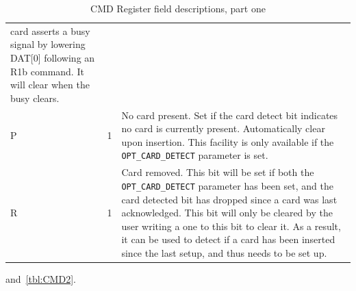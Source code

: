 \documentclass{gqtekspec}
\begin{document}
\begin{table}
\begin{center}
\begin{tabular}{|p{1.2in}|p{0.5in}|p{3.5in}|}
	card asserts a busy signal by lowering DAT[0] following an R1b command.
	It will clear when the busy clears.\\
P & 1 & No card present.  Set if the card detect bit indicates no card is
	currently present.  Automatically clear upon insertion.  This facility
	is only available if the {\tt OPT\_CARD\_DETECT} parameter is set.\\
R & 1 & Card removed.  This bit will be set if both the {\tt OPT\_CARD\_DETECT}
	parameter has been set, and the card detected bit has dropped since
	a card was last acknowledged.  This bit will only be cleared by the user
	writing a one to this bit to clear it.   As a result, it can be
	used to detect if a card has been inserted since the last setup, and
	thus needs to be set up. \\\hline
\end{tabular}
\caption{CMD Register field descriptions, part one}\label{tbl:CMD1}
\end{center}\end{table}
and~\ref{tbl:CMD2}.
\end{document}
